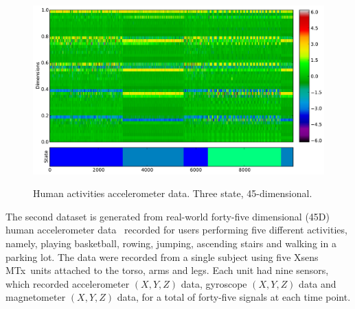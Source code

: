 \documentclass[12pt]{article}
\begin{document}
\begin{figure}[htbp]
  \caption{Human activities accelerometer data. Three state, 45-dimensional.}
  \centering
    \includegraphics[width=1.\linewidth]{images/accelerometer-data.pdf}
    \label{fig:accelerometer}
\end{figure}

The second dataset is generated from real-world forty-five dimensional (45D) human accelerometer data~\cite{Altun:2010:CSC:1823245.1823314} recorded for users performing five different activities, namely, playing basketball, rowing, jumping, ascending stairs and walking in a parking lot. The data were recorded from a single subject using five Xsens MTx\texttrademark\ units attached to the torso, arms and legs. Each unit had nine sensors, which recorded accelerometer $(X, Y, Z)$ data, gyroscope $(X,Y,Z)$ data and magnetometer $(X,Y,Z)$ data, for a total of forty-five signals at each time point.
\end{document}
